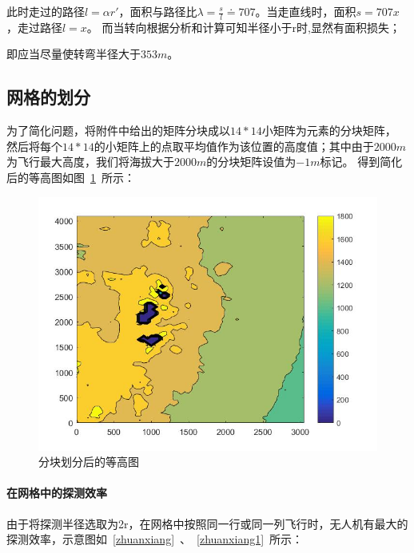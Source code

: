 \documentclass{whutmod}
\begin{document}
	
	此时走过的路径$l=\alpha r{}'$，面积与路径比$\lambda =\frac{s}{l}\doteq707$。当走直线时，面积$s=707x$，走过路径$l=x$。
	而当转向根据分析和计算可知半径小于r时,显然有面积损失；
	
	即应当尽量使转弯半径大于$353m$。
	
	\subsection{网格的划分}
	为了简化问题，将附件中给出的矩阵分块成以$14*14$小矩阵为元素的分块矩阵，
	然后将每个$14*14$的小矩阵上的点取平均值作为该位置的高度值；其中由于$2000m$为飞行最大高度，我们将海拔大于$2000m$的分块矩阵设值为$-1m$标记。
	得到简化后的等高图如图~\ref{img001}~所示：
	\begin{figure}[H]
		\centering
		\includegraphics[width=.9\textwidth]{figures/2.jpg}
		\caption{分块划分后的等高图}\label{img001}
	\end{figure}
	
	\paragraph{在网格中的探测效率}
	由于将探测半径选取为2r，在网格中按照同一行或同一列飞行时，无人机有最大的探测效率，示意图如~\ref{zhuanxiang}~、~\ref{zhuanxiang1}~所示：
	
\end{document}
